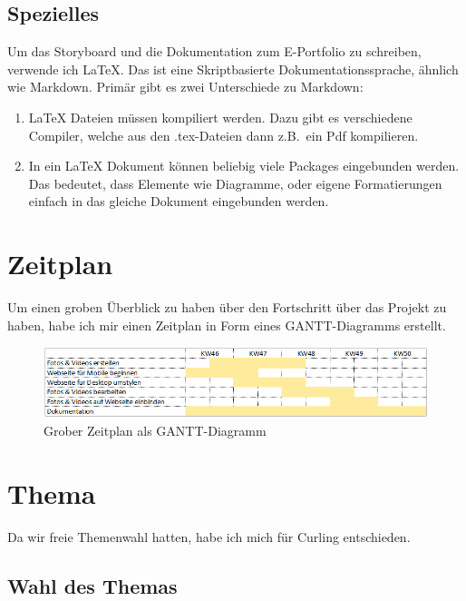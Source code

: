 \documentclass[11pt]{article}
\begin{document}
    \subsection{Spezielles}
    Um das Storyboard und die Dokumentation zum E-Portfolio zu schreiben, verwende ich \LaTeX. Das ist
    eine Skriptbasierte Dokumentationssprache, ähnlich wie Markdown. Primär gibt es zwei Unterschiede zu
    Markdown:
    \begin{enumerate}
        \item \LaTeX\xspace Dateien müssen kompiliert werden. Dazu gibt es verschiedene Compiler, welche aus den
        .tex-Dateien dann z.B.\ ein Pdf kompilieren.
        \item In ein \LaTeX\xspace Dokument können beliebig viele Packages eingebunden werden. Das bedeutet, dass
        Elemente wie Diagramme, oder eigene Formatierungen einfach in das gleiche Dokument eingebunden werden.
    \end{enumerate}

    \section{Zeitplan}
    Um einen groben Überblick zu haben über den Fortschritt über das Projekt zu haben, habe ich mir einen Zeitplan
    in Form eines GANTT-Diagramms erstellt.

    \begin{figure}[h]
        \centering
        \includegraphics[width=\textwidth]{media/timesheet}
        \caption{Grober Zeitplan als GANTT-Diagramm}
    \end{figure}

    \pagebreak
    \section{Thema}

    Da wir freie Themenwahl hatten, habe ich mich für Curling entschieden.

    \subsection{Wahl des Themas}
\end{document}
